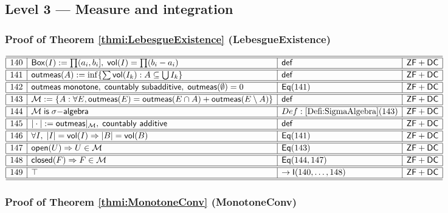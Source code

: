 \documentclass[11pt,reqno]{amsart}
\begin{document}
\medskip

\subsection*{\textsf{Level 3 --- Measure and integration}}

\subsubsection*{Proof of Theorem \ref{thmi:LebesgueExistence} (\textsf{LebesgueExistence})}

\noindent$%
\begin{array}{|r|l|l|l|}
\hline\hline
140 & \mathsf{Box}(I):=\prod(a_{i},b_{i}],\;\mathsf{vol}(I)=\prod(b_{i}-a_{i}) & \mathsf{def} & \mathsf{ZF+DC} \\ \hline\hline
141 & \mathsf{outmeas}(A):=\inf\{\sum\mathsf{vol}(I_{k}):A\subseteq\bigcup I_{k}\} & \mathsf{def} & \mathsf{ZF+DC} \\ \hline\hline
142 & \mathsf{outmeas}\;\mathsf{monotone},\;\mathsf{countably\ subadditive},\;\mathsf{outmeas}(\emptyset)=0 & \mathsf{Eq}(141) & \mathsf{ZF+DC} \\ \hline\hline
143 & \mathcal{M}:=\{A:\forall E,\mathsf{outmeas}(E)=\mathsf{outmeas}(E\cap A)+\mathsf{outmeas}(E\setminus A)\} & \mathsf{def} & \mathsf{ZF+DC} \\ \hline\hline
144 & \mathcal{M}\;\mathsf{is}\;\sigma\mathsf{-algebra} & Def:\ref{Defi:SigmaAlgebra}(143) & \mathsf{ZF+DC} \\ \hline\hline
145 & |\cdot|:=\mathsf{outmeas}|_{\mathcal{M}},\;\mathsf{countably\ additive} & \mathsf{def} & \mathsf{ZF+DC} \\ \hline\hline
146 & \forall I,\;|I|=\mathsf{vol}(I)\Rightarrow|B|=\mathsf{vol}(B) & \mathsf{Eq}(141) & \mathsf{ZF+DC} \\ \hline\hline
147 & \mathsf{open}(U)\Rightarrow U\in\mathcal{M} & \mathsf{Eq}(143) & \mathsf{ZF+DC} \\ \hline\hline
148 & \mathsf{closed}(F)\Rightarrow F\in\mathcal{M} & \mathsf{Eq}(144,147) & \mathsf{ZF+DC} \\ \hline\hline
149 & \top & \to\mathsf{I}(140,\dots,148) & \mathsf{ZF+DC} \\ \hline\hline
\end{array}%
$

\medskip

\subsubsection*{Proof of Theorem \ref{thmi:MonotoneConv} (\textsf{MonotoneConv})}
\end{document}

